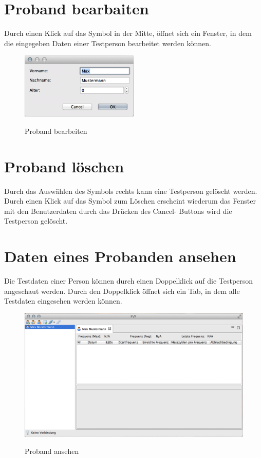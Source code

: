 \documentclass[11pt,accentcolor=tud2a,colorback,noheadingspace,bigchapter]{tudreport}
\begin{document}
\section{Proband bearbaiten}
\label{probands:proband-bearbaiten}
Durch einen Klick auf das Symbol in der Mitte, öffnet sich ein Fenster, in 
dem die eingegeben Daten einer Testperson bearbeitet werden können.

\begin{figure}[H]
	\centering
	\includegraphics[width=0.5\textwidth]{person_edit.png}
	\label{fig:proband-edit}
	\caption{Proband bearbeiten}
\end{figure}


\section{Proband löschen}
\label{probands:proband-loschen}
Durch das Auswählen des Symbols rechts kann eine Testperson gelöscht werden. 
Durch einen Klick auf das Symbol zum Löschen erscheint wiederum das Fenster 
mit den Benutzerdaten durch das Drücken des Cancel- Buttons wird die Testperson 
gelöscht.


\section{Daten eines Probanden ansehen}
\label{probands:daten-eines-probanden-ansehen}
Die Testdaten einer Person können durch einen Doppelklick auf die Testperson 
angeschaut werden. Durch den Doppelklick öffnet sich ein Tab, in dem alle 
Testdaten eingesehen werden können.

\begin{figure}[H]
	\includegraphics[width=\textwidth]{person_opened.png}
	\label{fig:proband-open}
	\caption{Proband ansehen}
\end{figure}
\end{document}
